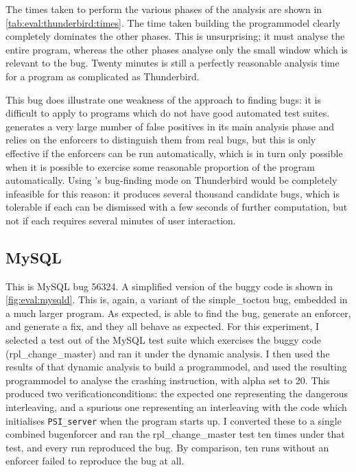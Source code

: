 The times taken to perform the various phases of the analysis are
shown in \autoref{tab:eval:thunderbird:times}.  The time taken
building the \gls{programmodel} clearly completely dominates the other
phases.  This is unsurprising; it must analyse the entire program,
whereas the other phases analyse only the small window which is
relevant to the bug.  Twenty minutes is still a perfectly reasonable
analysis time for a program as complicated as Thunderbird.

This bug does illustrate one weakness of the {\technique} approach to
finding bugs: it is difficult to apply to programs which do not have
good automated test suites.  {\Technique} generates a very large
number of false positives in its main analysis phase and relies on the
enforcers to distinguish them from real bugs, but this is only
effective if the enforcers can be run automatically, which is in turn
only possible when it is possible to exercise some reasonable
proportion of the program automatically.  Using {\technique}'s
bug-finding mode on Thunderbird would be completely infeasible for
this reason: it produces several thousand candidate bugs, which is
tolerable if each can be dismissed with a few seconds of further
computation, but not if each requires several minutes of user
interaction.

\subsection{MySQL}
\label{sect:eval:mysql}

This is MySQL bug 56324\needCite{}.  A simplified version of the buggy
code is shown in \autoref{fig:eval:mysqld}.  This is, again, a
variant of the simple\_toctou bug, embedded in a much larger program.
As expected, {\implementation} is able to find the bug, generate an
enforcer, and generate a fix, and they all behave as expected.  For
this experiment, I selected a test out of the MySQL test suite which
exercises the buggy code (rpl\_change\_master) and ran it under the
dynamic analysis.  I then used the results of that dynamic analysis to
build a \gls{programmodel}, and used the resulting \gls{programmodel}
to analyse the crashing instruction, with \gls{alpha} set to 20.  This
produced two \glspl{verificationcondition}: the expected one
representing the dangerous interleaving, and a spurious one
representing an interleaving with the code which initialises
\texttt{PSI\_server} when the program starts up.  I converted these to
a single combined \gls{bugenforcer} and ran the rpl\_change\_master
test ten times under that test, and every run reproduced the bug.  By
comparison, ten runs without an enforcer failed to reproduce the bug
at all.

